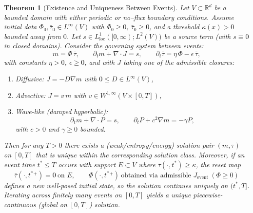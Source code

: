 \documentclass[11pt]{article}
\newtheorem{theorem}{Theorem}[section]
\begin{document}
\begin{theorem}[Existence and Uniqueness Between Events]
Let $V\subset\mathbb{R}^d$ be a bounded domain with either periodic or no–flux
boundary conditions. Assume initial data $\Phi_0, \bar{\tau}_0 \in L^\infty(V)$ with
$\Phi_0\ge 0$, $\bar{\tau}_0\ge 0$, and a threshold $\kappa(x)>0$ bounded away from $0$.
Let $s\in L^1_{\text{loc}}([0,\infty);L^2(V))$ be a source term (with $s\equiv 0$ in
closed domains). Consider the governing system between events:
\[
m=\Phi\,\bar{\tau}, \qquad
\partial_t m + \nabla\!\cdot J = s, \qquad
\partial_t \bar{\tau} = \eta\,\Phi - \epsilon\,\bar{\tau},
\]
with constants $\eta>0$, $\epsilon\ge 0$, and with $J$ taking one of the admissible closures:
\begin{enumerate}[leftmargin=*]
    \item \emph{Diffusive:} $J=-D\nabla m$ with $0\le D\in L^\infty(V)$,
    \item \emph{Advective:} $J=v\,m$ with $v\in W^{1,\infty}(V\times[0,T])$,
    \item \emph{Wave-like (damped hyperbolic):}
    \[
      \partial_t m + \nabla\!\cdot P = s, \qquad
      \partial_t P + c^2 \nabla m = -\gamma P,
    \]
    with $c>0$ and $\gamma\ge 0$ bounded.
\end{enumerate}
Then for any $T>0$ there exists a (weak/entropy/energy) solution pair $(m,\bar{\tau})$
on $[0,T]$ that is unique within the corresponding solution class. Moreover, if an event
time $t^\ast\le T$ occurs with support $E\subset V$ where $\bar{\tau}(\cdot,t^\ast)\ge \kappa$,
the reset map
\[
\bar{\tau}(\cdot,t^\ast{}^+)=0 \ \text{on }E, \qquad
\Phi(\cdot,t^\ast{}^+)\ \text{obtained via admissible } J_{\text{event}}\ (\Phi\ge 0)
\]
defines a new well-posed initial state, so the solution continues uniquely on $(t^\ast,T]$.
Iterating across finitely many events on $[0,T]$ yields a unique piecewise-continuous
(global on $[0,T]$) solution.
\end{theorem}
\end{document}
